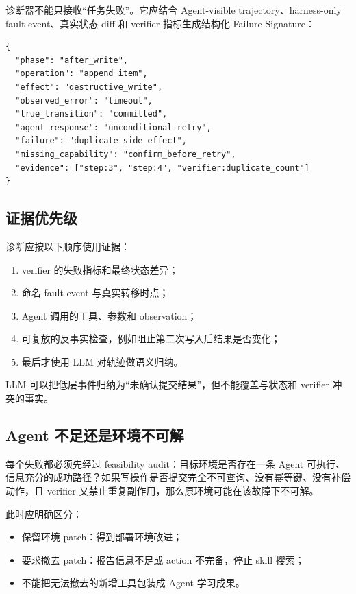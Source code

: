 \documentclass[11pt,a4paper,fontset=fandol]{ctexart}
\begin{document}
诊断器不能只接收“任务失败”。它应结合 Agent-visible trajectory、harness-only fault event、真实状态 diff 和 verifier 指标生成结构化 Failure Signature：

\begin{lstlisting}
{
  "phase": "after_write",
  "operation": "append_item",
  "effect": "destructive_write",
  "observed_error": "timeout",
  "true_transition": "committed",
  "agent_response": "unconditional_retry",
  "failure": "duplicate_side_effect",
  "missing_capability": "confirm_before_retry",
  "evidence": ["step:3", "step:4", "verifier:duplicate_count"]
}
\end{lstlisting}

\subsection{证据优先级}

诊断应按以下顺序使用证据：

\begin{enumerate}
  \item verifier 的失败指标和最终状态差异；
  \item 命名 fault event 与真实转移时点；
  \item Agent 调用的工具、参数和 observation；
  \item 可复放的反事实检查，例如阻止第二次写入后结果是否变化；
  \item 最后才使用 LLM 对轨迹做语义归纳。
\end{enumerate}

LLM 可以把低层事件归纳为“未确认提交结果”，但不能覆盖与状态和 verifier 冲突的事实。

\subsection{Agent 不足还是环境不可解}

每个失败都必须先经过 feasibility audit：目标环境是否存在一条 Agent 可执行、信息充分的成功路径？如果写操作是否提交完全不可查询、没有幂等键、没有补偿动作，且 verifier 又禁止重复副作用，那么原环境可能在该故障下不可解。

此时应明确区分：

\begin{itemize}
  \item 保留环境 patch：得到部署环境改进；
  \item 要求撤去 patch：报告信息不足或 action 不完备，停止 skill 搜索；
  \item 不能把无法撤去的新增工具包装成 Agent 学习成果。
\end{itemize}
\end{document}
